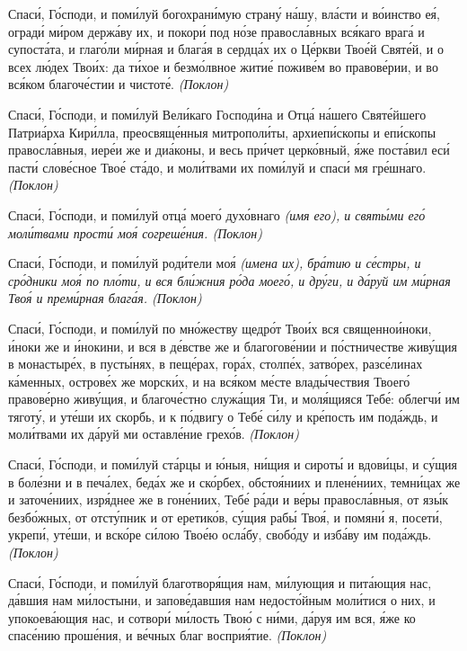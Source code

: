    Спаси́, Го́споди, и поми́луй богохрани́мую страну́ на́шу, вла́сти и
во́инство ея́, огради́ ми́ром держа́ву их, и покори́ под но́зе правосла́вных
вся́каго врага́ и супоста́та, и глаго́ли ми́рная и блага́я в сердца́х их о
Це́ркви Твое́й Святе́й, и о всех лю́дех Твои́х: да ти́хое и безмо́лвное
житие́ поживе́м во правове́рии, и во вся́ком благоче́стии и чистоте́.
\itshape (Поклон)\normalfont{}


   Спаси́, Го́споди, и поми́луй Вели́каго Господи́на и Отца́ на́шего Святе́йшего
Патриа́рха Кири́лла, преосвяще́нныя митрополи́ты, архиепи́скопы и
епи́скопы правосла́вныя, иере́и же и диа́коны, и весь при́чет церко́вный, я́же
поста́вил еси́ пасти́ слове́сное Твое́ ста́до, и моли́твами их поми́луй и спаси́
мя гре́шнаго. \itshape (Поклон)\normalfont{}


   Спаси́, Го́споди, и поми́луй отца́ моего́ духо́внаго \itshape (имя его)\normalfont{}, и святы́ми его́
моли́твами прости́ моя́ согреше́ния. \itshape (Поклон)\normalfont{}


   Спаси́, Го́споди, и поми́луй роди́тели моя́ \itshape (имена их)\normalfont{}, бра́тию и се́стры, и
сро́дники моя́ по пло́ти, и вся бли́жния ро́да моего́, и дру́ги, и да́руй им
ми́рная Твоя́ и преми́рная блага́я. \itshape (Поклон)\normalfont{}


   Спаси́, Го́споди, и поми́луй по мно́жеству щедро́т Твои́х вся священнои́ноки,
и́ноки же и и́нокини, и вся в де́встве же и благогове́нии и по́стничестве
живу́щия в монастыре́х, в пусты́нях, в пеще́рах, гора́х, столпе́х, затво́рех,
разсе́линах ка́менных, острове́х же морски́х, и на вся́ком ме́сте влады́чествия
Твоего́ правове́рно живу́щия, и благоче́стно служа́щия Ти, и моля́щияся
Тебе́: облегчи́ им тяготу́, и уте́ши их скорбь, и к по́двигу о Тебе́ си́лу и
кре́пость им пода́ждь, и моли́твами их да́руй ми оставле́ние грехо́в.
\itshape (Поклон)\normalfont{}


   Спаси́, Го́споди, и поми́луй ста́рцы и ю́ныя, ни́щия и сироты́ и вдови́цы, и
су́щия в боле́зни и в печа́лех, беда́х же и ско́рбех, обстоя́ниих и плене́ниих,
темни́цах же и заточе́ниих, изря́днее же в гоне́ниих, Тебе́ ра́ди и ве́ры
правосла́вныя, от язы́к безбо́жных, от отсту́пник и от еретико́в, су́щия рабы́
Твоя́, и помяни́ я, посети́, укрепи́, уте́ши, и вско́ре си́лою Твое́ю осла́бу,
свобо́ду и изба́ву им пода́ждь. \itshape (Поклон)\normalfont{}


   Спаси́, Го́споди, и поми́луй благотворя́щия нам, ми́лующия и пита́ющия
нас, да́вшия нам ми́лостыни, и запове́давшия нам недосто́йным моли́тися о
них, и упокоева́ющия нас, и сотвори́ ми́лость Твою́ с ни́ми, да́руя им вся,
я́же ко спасе́нию проше́ния, и ве́чных благ восприя́тие. \itshape (Поклон)\normalfont{}


